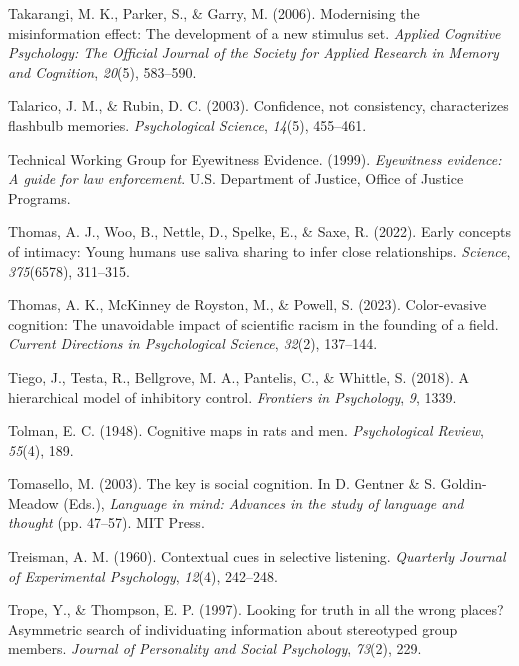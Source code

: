 \documentclass[
]{krantz}
\newlength{\cslhangindent}
\newenvironment{CSLReferences}[2] %
 {\begin{list}{}{%
  \setlength{\itemindent}{0pt}
  \setlength{\leftmargin}{0pt}
  \setlength{\parsep}{0pt}
  \ifodd #1
   \setlength{\leftmargin}{\cslhangindent}
   \setlength{\itemindent}{-1\cslhangindent}
  \fi
  \setlength{\itemsep}{#2\baselineskip}}}
 {\end{list}}
\begin{document}
\begin{CSLReferences}{1}{0}
Takarangi, M. K., Parker, S., \& Garry, M. (2006). Modernising the misinformation effect: The development of a new stimulus set. \emph{Applied Cognitive Psychology: The Official Journal of the Society for Applied Research in Memory and Cognition}, \emph{20}(5), 583--590.

Talarico, J. M., \& Rubin, D. C. (2003). Confidence, not consistency, characterizes flashbulb memories. \emph{Psychological Science}, \emph{14}(5), 455--461.

Technical Working Group for Eyewitness Evidence. (1999). \emph{Eyewitness evidence: A guide for law enforcement}. U.S. Department of Justice, Office of Justice Programs.

Thomas, A. J., Woo, B., Nettle, D., Spelke, E., \& Saxe, R. (2022). Early concepts of intimacy: Young humans use saliva sharing to infer close relationships. \emph{Science}, \emph{375}(6578), 311--315.

Thomas, A. K., McKinney de Royston, M., \& Powell, S. (2023). Color-evasive cognition: The unavoidable impact of scientific racism in the founding of a field. \emph{Current Directions in Psychological Science}, \emph{32}(2), 137--144.

Tiego, J., Testa, R., Bellgrove, M. A., Pantelis, C., \& Whittle, S. (2018). A hierarchical model of inhibitory control. \emph{Frontiers in Psychology}, \emph{9}, 1339.

Tolman, E. C. (1948). Cognitive maps in rats and men. \emph{Psychological Review}, \emph{55}(4), 189.

Tomasello, M. (2003). The key is social cognition. In D. Gentner \& S. Goldin-Meadow (Eds.), \emph{Language in mind: Advances in the study of language and thought} (pp. 47--57). MIT Press.

Treisman, A. M. (1960). Contextual cues in selective listening. \emph{Quarterly Journal of Experimental Psychology}, \emph{12}(4), 242--248.

Trope, Y., \& Thompson, E. P. (1997). Looking for truth in all the wrong places? Asymmetric search of individuating information about stereotyped group members. \emph{Journal of Personality and Social Psychology}, \emph{73}(2), 229.


\end{CSLReferences}
\end{document}

